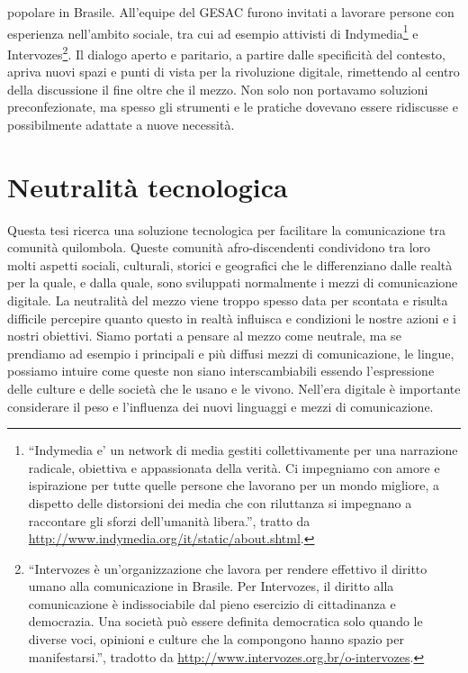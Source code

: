popolare in Brasile. All'equipe del GESAC furono invitati a lavorare
persone con esperienza nell'ambito sociale, tra cui ad esempio
attivisti di Indymedia\footnote{``Indymedia e' un network di media
  gestiti collettivamente per una narrazione radicale, obiettiva e
  appassionata della verità. Ci impegniamo con amore e ispirazione per
  tutte quelle persone che lavorano per un mondo migliore, a dispetto
  delle distorsioni dei media che con riluttanza si impegnano a
  raccontare gli sforzi dell'umanità libera.'', tratto da
  \url{http://www.indymedia.org/it/static/about.shtml}.} e
Intervozes\footnote{``Intervozes è un'organizzazione che lavora per
  rendere effettivo il diritto umano alla comunicazione in Brasile.
  Per Intervozes, il diritto alla comunicazione è indissociabile dal
  pieno esercizio di cittadinanza e democrazia. Una società può essere
  definita democratica solo quando le diverse voci, opinioni e culture
  che la compongono hanno spazio per manifestarsi.'', tradotto da
  \url{http://www.intervozes.org.br/o-intervozes}.}. Il dialogo aperto e
paritario, a partire dalle specificità del contesto, apriva nuovi
spazi e punti di vista per la rivoluzione digitale, rimettendo al
centro della discussione il fine oltre che il mezzo. Non solo non
portavamo soluzioni preconfezionate, ma spesso gli strumenti e le
pratiche dovevano essere ridiscusse e possibilmente adattate a nuove
necessità.

\section{Neutralità tecnologica}
Questa tesi ricerca una soluzione tecnologica per facilitare la
comunicazione tra comunità quilombola. Queste comunità
afro-discendenti condividono tra loro molti aspetti sociali,
culturali, storici e geografici che le differenziano dalle realtà per
la quale, e dalla quale, sono sviluppati normalmente i mezzi di
comunicazione digitale. La neutralità del mezzo viene troppo spesso
data per scontata e risulta difficile percepire quanto questo in
realtà influisca e condizioni le nostre azioni e i nostri
obiettivi. Siamo portati a pensare al mezzo come neutrale, ma se
prendiamo ad esempio i principali e più diffusi mezzi di
comunicazione, le lingue, possiamo intuire come queste non siano
interscambiabili essendo l'espressione delle culture e delle società
che le usano e le vivono. Nell'era digitale è importante considerare
il peso e l'influenza dei nuovi linguaggi e mezzi di comunicazione.

